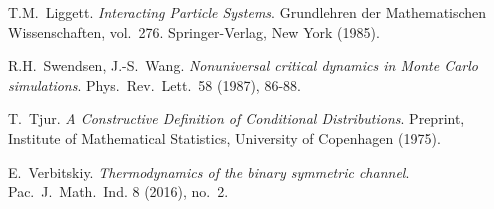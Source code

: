 \documentclass[12pt]{article}
\newcommand{\1}{\mathbbm{1}}
\newcommand{\5}{\vspace{0.5cm}}
\theoremstyle{definition}
\begin{document}
\begin{thebibliography}{++}
 T.M.~Liggett. \textit{Interacting Particle Systems}. Grundlehren der Mathematischen Wissenschaften, vol.~276. Springer-Verlag, New York (1985).

 R.H.~Swendsen, J.-S.~Wang. \textit{Nonuniversal critical dynamics in Monte Carlo simulations}. Phys.~Rev.~Lett.~58 (1987), 86-88.

 T.~Tjur. \textit{A Constructive Definition of Conditional Distributions}. Preprint, Institute of Mathematical Statistics, University of Copenhagen (1975).

 E.~Verbitskiy. \textit{Thermodynamics of the binary symmetric channel}. Pac.~J.~Math.~Ind. 8 (2016), no.~2.

\end{thebibliography}

\end{document}
